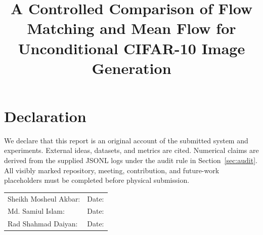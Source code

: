 \documentclass{iutbscthesis}
\title{A Controlled Comparison of Flow Matching and Mean Flow for Unconditional CIFAR-10 Image Generation}
\begin{document}
\titlepage
\chapter*{Declaration}
We declare that this report is an original account of the submitted system and experiments. External ideas, datasets, and metrics are cited. Numerical claims are derived from the supplied JSONL logs under the audit rule in Section~\ref{sec:audit}. All visibly marked repository, meeting, contribution, and future-work placeholders must be completed before physical submission.
\par\vspace{2cm}
\noindent\begin{tabularx}{\textwidth}{X p{}}
Sheikh Mosheul Akbar: \hrulefill & Date: \hrulefill\\[2em]
Md. Samiul Islam: \hrulefill & Date: \hrulefill\\[2em]
Rad Shahmad Daiyan: \hrulefill & Date: \hrulefill
\end{tabularx}
\clearpage
\end{document}
